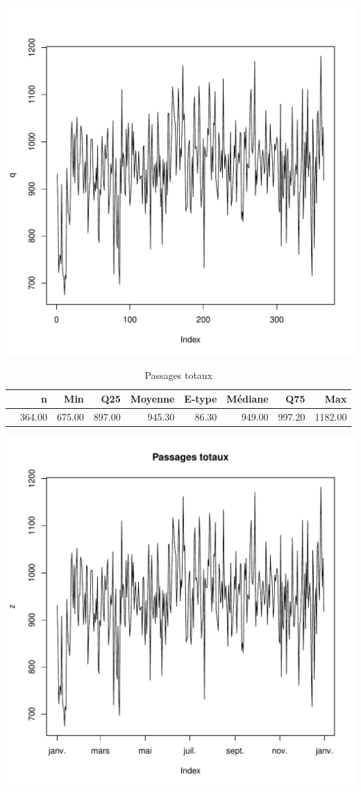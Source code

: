 \documentclass[12pt,english,french,twoside]{book}\usepackage[]{graphicx}\usepackage[]{color}
\makeatletter
\def\maxwidth{ %
  \ifdim\Gin@nat@width>\linewidth
    \linewidth
  \else
    \Gin@nat@width
  \fi
}
\makeatother
\begin{document}
\includegraphics[width=\maxwidth]{figure/passages_totaux1} 
\begin{table}[ht]
\centering
\begin{tabular}{rrrrrrrrr}
  \hline
 & n & Min & Q25 & Moyenne & E-type & Médiane & Q75 & Max \\ 
  \hline
 & 364.00 & 675.00 & 897.00 & 945.30 & 86.30 & 949.00 & 997.20 & 1182.00 \\ 
   \hline
\end{tabular}
\caption[Passages totaux]{Passages totaux} 
\label{tab:pt}
\end{table}

\includegraphics[width=\maxwidth]{figure/passages_totaux2} 
\end{document}

